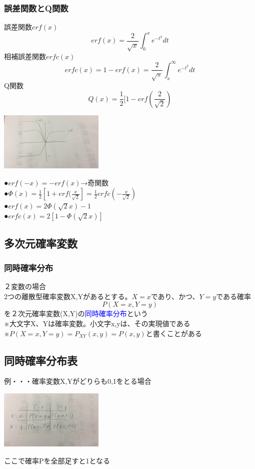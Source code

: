 \documentclass{jsarticle}
\begin{document}
	\subsubsection{誤差関数とQ関数}
		誤差関数$erf(x)$\\
		\[
			erf(x)=\frac{2}{\sqrt{x}}\int^x_0e^{-t^2}dt
		\]
		相補誤差関数$erfc(x)$\\
		\[
			erfc(x)=1-erf(x)=\frac{2}{\sqrt{π}}\int^∞_xe^{-t^2}dt
		\]
		{\large{Q関数}}
		\[
			Q(x)=\frac{1}{2}[1-erf(\frac{2}{\sqrt{2}})
		\]
		\begin{center}
			\includegraphics[width=5cm]{11_9_2.JPG}
		\end{center}
		●$erf(-x)=-erf(x)$→奇関数\\
		●$Φ(x)=\frac{1}{2}[1+erf(\frac{x}{\sqrt{2}}]=\frac{1}{2}erfc(-\frac{x}{\sqrt{2}})$\\
		●$erf(x)=2Φ(\sqrt{2}x)-1$\\
		●$erfc(x)=2[1-Φ(\sqrt{2}x)]$\\
		
\subsection{多次元確率変数}
	\subsubsection{同時確率分布}
		{\large{２変数の場合}}\\
		2つの離散型確率変数X,Yがあるとする。$X=x$であり、かつ、$Y=y$である確率
		\[
			P(X=x,Y=y)
		\]
		を２次元確率変数(X,Y)の{\textcolor{blue}{同時確率分布}}という\\
		※大文字X、Yは確率変数。小文字x,yは、その実現値である\\
		※$P(X=x,Y=y)=P_{XY}(x,y)=P(x,y)$と書くことがある\\
		
	\subsection{同時確率分布表}
		例・・・確率変数X,Yがどりらも0,1をとる場合
		\begin{center}
			\includegraphics[width=5cm]{11_9_3.JPG}
		\end{center}
		ここで確率Pを全部足すと1となる
		
\end{document}
